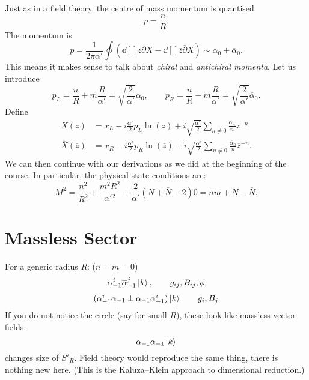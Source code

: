 Just as in a field theory, the centre of mass momentum is quantised
\begin{equation}
  p = \frac{n}{R}.
\end{equation}
The momentum is
\begin{equation}
  p = \frac{1}{2\pi \alpha'} \oint (\dd[]{z} \partial X - \dd[]{\overline{z}{}} \overline{\partial}{}X) \sim \alpha_0 + \overline{\alpha}{}_0.
\end{equation}
This means it makes sense to talk about \emph{chiral} and \emph{antichiral momenta}.
Let us introduce
\begin{equation}
  p_L = \frac{n}{R} + m \frac{R}{\alpha'} = \sqrt{\frac{2}{\alpha'}} \alpha_0, \qquad
  p_R = \frac{n}{R} - m \frac{R}{\alpha'} = \sqrt{\frac{2}{\alpha'}}\overline{ \alpha}{}_0.
\end{equation}
Define
\begin{align}
  X(z) &= x_L - i \frac{\alpha'}{2} p_L \ln (z) + i \sqrt{\frac{\alpha'}{2}} \sum_{n \neq 0} \frac{\alpha_n}{n} z^{-n} \\
  \overline{X}{}(\overline{z}{}) &= x_R - i \frac{\alpha'}{2} p_R \ln (\overline{z}{}) + i \sqrt{\frac{\alpha'}{2}} \sum_{n \neq 0} \frac{\overline{\alpha}{}_n}{n} \overline{z}{}^{-n}.
\end{align}
We can then continue with our derivations as we did at the beginning of the course.
In particular, the physical state conditions are:
\begin{subequations}
  \label{eq:physstatecond}
  \begin{equation}
    M^2 = \frac{n^2}{R^2} + \frac{m^2 R^2}{\alpha'{}^2} + \frac{2}{\alpha'} (N + \overline{N}{} -2)
  \end{equation}
  \begin{equation}
    0 = nm + N - \overline{N}{}.
  \end{equation}
\end{subequations}

\section{Massless Sector}%
\label{sec:massless_sector}

For a generic radius $R$: ($n = m  = 0$)
\begin{equation}
  \alpha^{i}_{-1} \overline{\alpha}{}^{j}_{-1} \ket{k}, \qquad g_{ij}, B_{ij}, \phi
\end{equation}
\begin{equation}
  (\alpha^{i}_{-1} \alpha_{-1} \pm \alpha_{-1} \alpha^{i}_{-1}) \ket{k} \qquad g_{i}, B_j
\end{equation}
If you do not notice the circle (say for small $R$), these look like massless vector fields.
\begin{equation}
  \alpha_{-1} \alpha_{-1} \ket{k}
\end{equation}
changes size of $S'_R$.
Field theory would reproduce the same thing, there is nothing new here. (This is the Kaluza--Klein approach to dimensional reduction.)

